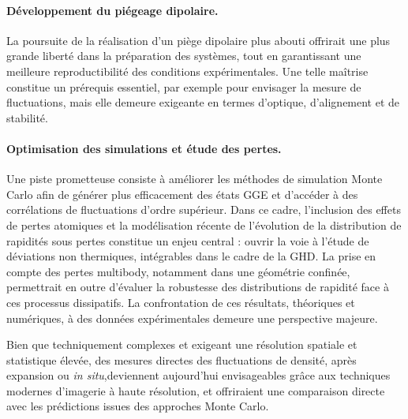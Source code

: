 \paragraph*{Développement du piégeage dipolaire.}
La poursuite de la réalisation d’un piège dipolaire plus abouti offrirait une plus grande liberté dans la préparation des systèmes, tout en garantissant une meilleure reproductibilité des conditions expérimentales. Une telle maîtrise constitue un prérequis essentiel, par exemple pour envisager la mesure de fluctuations, mais elle demeure exigeante en termes d’optique, d’alignement et de stabilité.


\paragraph*{Optimisation des simulations et étude des pertes.}
Une piste prometteuse consiste à améliorer les méthodes de simulation Monte Carlo afin de générer plus efficacement des états \gls{GGE} et d’accéder à des corrélations de fluctuations d’ordre supérieur. Dans ce cadre, l’inclusion des effets de pertes atomiques et la modélisation récente de l’évolution de la distribution de rapidités sous pertes \cite{10.21468/SciPostPhys.9.4.044} constitue un enjeu central : ouvrir la voie à l’étude de déviations non thermiques, intégrables dans le cadre de la GHD. La prise en compte des pertes multibody, notamment dans une géométrie confinée, permettrait en outre d’évaluer la robustesse des distributions de rapidité face à ces processus dissipatifs. La confrontation de ces résultats, théoriques et numériques,  à des données expérimentales demeure une perspective majeure.

Bien que techniquement complexes et exigeant une résolution spatiale et statistique élevée, des mesures directes des fluctuations de densité, après expansion ou \emph{in situ},deviennent aujourd’hui envisageables grâce aux techniques modernes d’imagerie à haute résolution, et offriraient une comparaison directe avec les prédictions issues des approches Monte Carlo.
